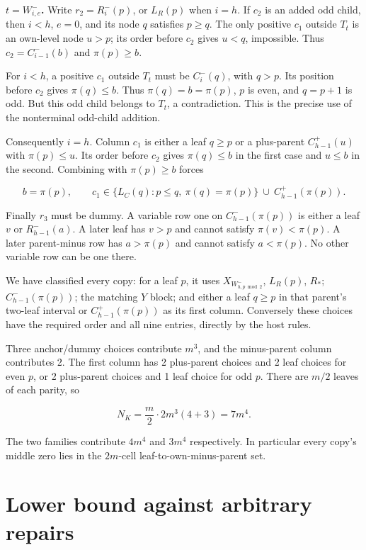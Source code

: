 \documentclass[11pt,letterpaper]{article}
\begin{document}
\textbf{\boldmath \(t=W_{i,e}^-\).} Write \(r_{2}=R_i^-(p)\), or
\(L_R(p)\) when \(i=h\). If \(c_{2}\) is an added odd child, then
\(i<h\), \(e=0\), and its node \(q\) satisfies \(p\ge q\). The only
positive \(c_{1}\) outside \(T_t\) is an own-level node \(u>p\); its
order before \(c_{2}\) gives \(u<q\), impossible. Thus
\(c_{2}=C_{i-1}^-(b)\) and \(\pi (p)\ge b\).

For \(i<h\), a positive \(c_{1}\) outside \(T_t\) must be \(C_i^-(q)\),
with \(q>p\). Its position before \(c_{2}\) gives \(\pi (q)\le b\). Thus
\(\pi (q)=b=\pi (p)\), \(p\) is even, and \(q=p+1\) is odd. But this odd
child belongs to \(T_t\), a contradiction. This is the precise use of
the nonterminal odd-child addition.

Consequently \(i=h\). Column \(c_{1}\) is either a leaf \(q\ge p\) or a
plus-parent \(C_{h-1}^+(u)\) with \(\pi (p)\le u\). Its order before
\(c_{2}\) gives \(\pi (q)\le b\) in the first case and \(u\le b\) in the
second. Combining with \(\pi (p)\ge b\) forces

\[
 b=\pi(p),\qquad
 c_1\in\{L_C(q):p\le q,\ \pi(q)=\pi(p)\}
          \ \cup\ C_{h-1}^+(\pi(p)).
\]

Finally \(r_{3}\) must be dummy. A variable row one on
\(C_{h-1}^-(\pi (p))\) is either a leaf \(v\) or \(R_{h-1}^-(a)\). A
later leaf has \(v>p\) and cannot satisfy \(\pi (v)<\pi (p)\). A later
parent-minus row has \(a>\pi (p)\) and cannot satisfy \(a<\pi (p)\). No
other variable row can be one there.

We have classified every copy: for a leaf \(p\), it uses
\(X_{W_{h,p \bmod 2}^-}\), \(L_R(p)\), \(R_*\); \(C_{h-1}^-(\pi (p))\);
the matching \(Y\) block; and either a leaf \(q\ge p\) in that parent's
two-leaf interval or \(C_{h-1}^+(\pi (p))\) as its first column.
Conversely these choices have the required order and all nine entries,
directly by the host rules.

Three anchor/dummy choices contribute \(m^{3}\), and the minus-parent
column contributes 2. The first column has 2 plus-parent choices and 2
leaf choices for even \(p\), or 2 plus-parent choices and 1 leaf choice
for odd \(p\). There are \(m/2\) leaves of each parity, so

\[
 N_K=\frac m2\cdot2m^3(4+3)=7m^4.
\]

The two families contribute \(4m^{4}\) and \(3m^{4}\) respectively. In
particular every copy's middle zero lies in the \(2m\)-cell
leaf-to-own-minus-parent set.

\section{Lower bound against arbitrary
repairs}\label{lower-bound-against-arbitrary-repairs}
\end{document}
